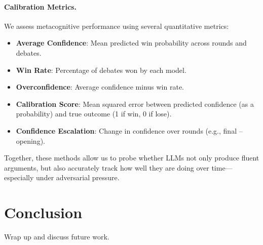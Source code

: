 \documentclass[11pt]{article}
\begin{document}
\paragraph{Calibration Metrics.}
We assess metacognitive performance using several quantitative metrics:
\begin{itemize}
  \item \textbf{Average Confidence}: Mean predicted win probability across rounds and debates.
  \item \textbf{Win Rate}: Percentage of debates won by each model.
  \item \textbf{Overconfidence}: Average confidence minus win rate.
  \item \textbf{Calibration Score}: Mean squared error between predicted confidence (as a probability) and true outcome (1 if win, 0 if lose).
  \item \textbf{Confidence Escalation}: Change in confidence over rounds (e.g., final – opening).
\end{itemize}

Together, these methods allow us to probe whether LLMs not only produce fluent arguments, but also accurately track how well they are doing over time—especially under adversarial pressure.



\section{Conclusion}
Wrap up and discuss future work.



\end{document}
